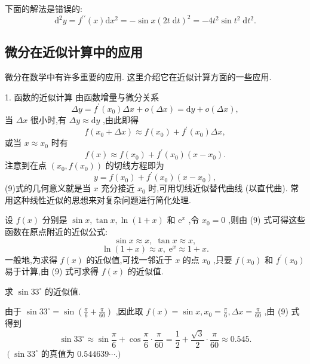 \begin{remark}
下面的解法是错误的:
\[
{\mathrm{d}}^{2}y = {f}^{\prime \prime }\left( x\right) \mathrm{d}{x}^{2} =  - \sin x{\left( 2t\mathrm{\;d}t\right) }^{2} =  - 4{t}^{2}\sin {t}^{2}\mathrm{\;d}{t}^{2}.
\]
\end{remark}

\subsection{微分在近似计算中的应用}

微分在数学中有许多重要的应用. 这里介绍它在近似计算方面的一些应用.

1. 函数的近似计算 由函数增量与微分关系
\[
{\Delta y} = {f}^{\prime }\left( {x}_{0}\right) {\Delta x} + o\left( {\Delta x}\right)  = \mathrm{d}y + o\left( {\Delta x}\right) ,
\]
当 \({\Delta x}\) 很小时,有 \({\Delta y} \approx  \mathrm{d}y\) ,由此即得
\[
f\left( {{x}_{0} + {\Delta x}}\right)  \approx  f\left( {x}_{0}\right)  + {f}^{\prime }\left( {x}_{0}\right) {\Delta x}, \tag{8}
\]
或当 \(x \approx  {x}_{0}\) 时有
\[
f\left( x\right)  \approx  f\left( {x}_{0}\right)  + {f}^{\prime }\left( {x}_{0}\right) \left( {x - {x}_{0}}\right) . \tag{9}
\]
注意到在点 \(\left( {{x}_{0},f\left( {x}_{0}\right) }\right)\) 的切线方程即为
\[
y = f\left( {x}_{0}\right)  + {f}^{\prime }\left( {x}_{0}\right) \left( {x - {x}_{0}}\right) ,
\]
(9)式的几何意义就是当 \(x\) 充分接近 \({x}_{0}\) 时,可用切线近似替代曲线 (以直代曲). 常用这种线性近似的思想来对复杂问题进行简化处理.

设 \(f\left( x\right)\) 分别是 \(\sin x,\tan x,\ln \left( {1 + x}\right)\) 和 \({\mathrm{e}}^{x}\) ,令 \({x}_{0} = 0\) ,则由 (9) 式可得这些函数在原点附近的近似公式:
\[
\sin x \approx  x,\;\tan x \approx  x,
\]
\[
\ln \left( {1 + x}\right)  \approx  x,\;{\mathrm{e}}^{x} \approx  1 + x.
\]
一般地,为求得 \(f\left( x\right)\) 的近似值,可找一邻近于 \(x\) 的点 \({x}_{0}\) ,只要 \(f\left( {x}_{0}\right)\) 和 \({f}^{\prime }\left( {x}_{0}\right)\) 易于计算,由 (9) 式可求得 \(f\left( x\right)\) 的近似值.

\begin{example}
求 \(\sin {33}^{ \circ  }\) 的近似值.
\end{example}


\begin{solution}
由于 \(\sin {33}^{ \circ  } = \sin \left( {\frac{\pi }{6} + \frac{\pi }{60}}\right)\) ,因此取 \(f\left( x\right)  = \sin x,{x}_{0} = \frac{\pi }{6},{\Delta x} = \frac{\pi }{60}\) ,由 (9) 式得到
\[
\sin {33}^{ \circ  } \approx  \sin \frac{\pi }{6} + \cos \frac{\pi }{6} \cdot  \frac{\pi }{60} = \frac{1}{2} + \frac{\sqrt{3}}{2} \cdot  \frac{\pi }{60} \approx  {0.545}.
\]
\(\left( {\sin {33}^{ \circ  }}\right.\) 的真值为 \({0.544639}\cdots .)\)
\end{solution}


